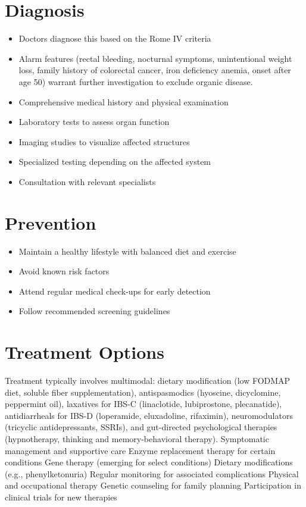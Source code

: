 \section{Diagnosis}
\begin{itemize}[noitemsep]
  \item Doctors diagnose this based on the Rome IV criteria
  \item Alarm features (rectal bleeding, nocturnal symptoms, unintentional weight loss, family history of colorectal cancer, iron deficiency anemia, onset after age 50) warrant further investigation to exclude organic disease.
  \item Comprehensive medical history and physical examination
  \item Laboratory tests to assess organ function
  \item Imaging studies to visualize affected structures
  \item Specialized testing depending on the affected system
  \item Consultation with relevant specialists
\end{itemize}
\section{Prevention}
\begin{itemize}[noitemsep]
  \item Maintain a healthy lifestyle with balanced diet and exercise
  \item Avoid known risk factors
  \item Attend regular medical check-ups for early detection
  \item Follow recommended screening guidelines
\end{itemize}
\section{Treatment Options}
Treatment typically involves multimodal: dietary modification (low FODMAP diet, soluble fiber supplementation), antispasmodics (hyoscine, dicyclomine, peppermint oil), laxatives for IBS-C (linaclotide, lubiprostone, plecanatide), antidiarrheals for IBS-D (loperamide, eluxadoline, rifaximin), neuromodulators (tricyclic antidepressants, SSRIs), and gut-directed psychological therapies (hypnotherapy, thinking and memory-behavioral therapy). Symptomatic management and supportive care Enzyme replacement therapy for certain conditions Gene therapy (emerging for select conditions) Dietary modifications (e.g., phenylketonuria) Regular monitoring for associated complications Physical and occupational therapy Genetic counseling for family planning Participation in clinical trials for new therapies

